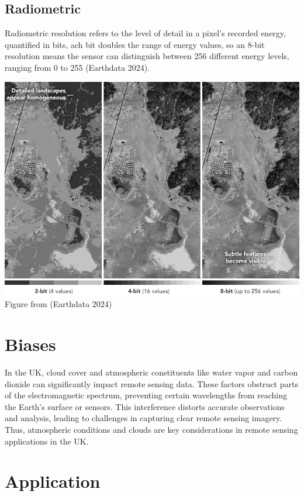 \documentclass[
  letterpaper,
  DIV=11,
  numbers=noendperiod]{scrreprt}
\begin{document}
\subsection{Radiometric}\label{radiometric}

Radiometric resolution refers to the level of detail in a pixel's
recorded energy, quantified in bits, ach bit doubles the range of energy
values, so an 8-bit resolution means the sensor can distinguish between
256 different energy levels, ranging from 0 to 255 (Earthdata 2024).

\includegraphics{radiometric_resolution.png} Figure from (Earthdata
2024)

\section{Biases}\label{biases}

In the UK, cloud cover and atmospheric constituents like water vapor and
carbon dioxide can significantly impact remote sensing data. These
factors obstruct parts of the electromagnetic spectrum, preventing
certain wavelengths from reaching the Earth's surface or sensors. This
interference distorts accurate observations and analysis, leading to
challenges in capturing clear remote sensing imagery. Thus, atmospheric
conditions and clouds are key considerations in remote sensing
applications in the UK.

\section{Application}\label{application}
\end{document}
